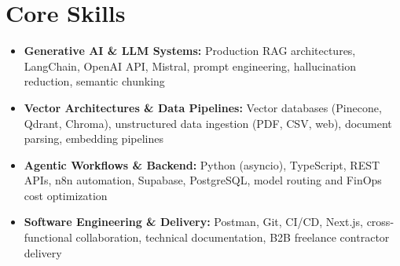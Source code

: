\documentclass[a4paper,10pt]{article}
\begin{document}
\section{Core Skills}
\begin{itemize}
 \item \textbf{Generative AI \& LLM Systems:} Production RAG architectures, LangChain, OpenAI API, Mistral, prompt engineering, hallucination reduction, semantic chunking
 \item \textbf{Vector Architectures \& Data Pipelines:} Vector databases (Pinecone, Qdrant, Chroma), unstructured data ingestion (PDF, CSV, web), document parsing, embedding pipelines
 \item \textbf{Agentic Workflows \& Backend:} Python (asyncio), TypeScript, REST APIs, n8n automation, Supabase, PostgreSQL, model routing and FinOps cost optimization
 \item \textbf{Software Engineering \& Delivery:} Postman, Git, CI/CD, Next.js, cross-functional collaboration, technical documentation, B2B freelance contractor delivery
\end{itemize}
\end{document}
